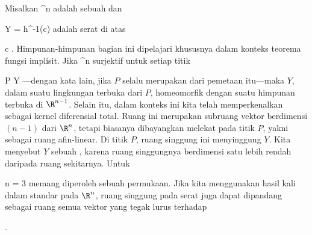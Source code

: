 \setcounter{section}{1}


Misalkan
 {\R^n } { \R
} {}
adalah sebuah
dan

\mavergleichskette
{\vergleichskette
{ Y
}
{ = }{ h^{-1}(c)
}
{  }{
}
{    }{
}
{   }{
}
}
{}{}{}
adalah serat di atas

\mavergleichskette
{\vergleichskette
{ c
}
{ \in }{ \R
}
{  }{
}
{    }{
}
{   }{
}
}
{}{}{.}
Himpunan-himpunan bagian ini dipelajari khususnya dalam konteks teorema fungsi implisit. Jika
 {\R^n } { \R
} {}
surjektif untuk setiap titik

\mavergleichskette
{\vergleichskette
{ P
}
{ \in }{ Y
}
{  }{
}
{    }{
}
{   }{
}
}
{}{}{}
---dengan kata lain, jika $P$ selalu merupakan
dari pemetaan itu---maka $Y$, dalam suatu lingkungan terbuka dari $P$, homeomorfik dengan suatu himpunan terbuka di $\R^{n-1}$. Selain itu, dalam konteks ini kita telah memperkenalkan
sebagai kernel diferensial total. Ruang ini merupakan subruang vektor berdimensi $(n-1 )$ dari $\R^n$, tetapi biasanya dibayangkan melekat pada titik $P$, yakni sebagai ruang afin-linear. Di titik $P$, ruang singgung ini menyinggung $Y$. Kita menyebut $Y$ sebuah  {,} karena ruang singgungnya berdimensi satu lebih rendah daripada ruang sekitarnya. Untuk

\mavergleichskette
{\vergleichskette
{ n
}
{ = }{ 3
}
{  }{
}
{    }{
}
{   }{
}
}
{}{}{}
memang diperoleh sebuah permukaan. Jika kita menggunakan hasil kali dalam standar pada $\R^n$, ruang singgung pada serat juga dapat dipandang sebagai ruang semua vektor yang tegak lurus terhadap

.

